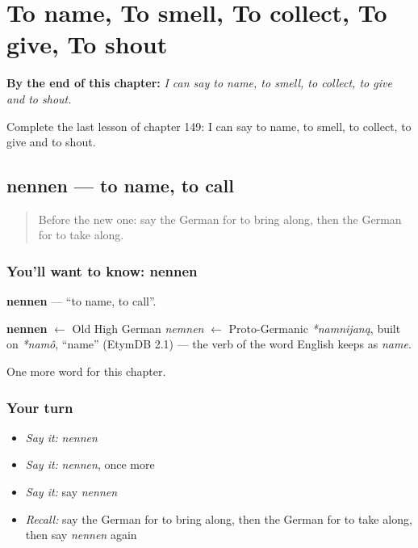 
\chapter{To name, To smell, To collect, To give, To shout}
\label{ch:ge-to-name-to-smell-to-collect-to-give-to-shout}

\begin{chapteropening}
\textbf{By the end of this chapter:} \emph{I can say to name, to smell, to collect, to give and to shout.}

Complete the last lesson of chapter 149: I can say to name, to smell, to collect, to give and to shout.
\end{chapteropening}

\section[nennen]{nennen — to name, to call}

\label{lesson:GE-C149-nennen}



\begin{quote}
Before the new one: say the German for to bring along, then the German for to take along.
\end{quote}

\subsection*{You'll want to know: nennen}
\textbf{nennen} — \textquotedblleft{}to name, to call\textquotedblright{}.

\begin{cousinweb}
\textbf{nennen} $\leftarrow$ Old High German \emph{nemnen} $\leftarrow$ Proto-Germanic \emph{*namnijaną}, built on \emph{*namô}, \textquotedblleft{}name\textquotedblright{} (EtymDB 2.1) — the verb of the word English keeps as \emph{name}.
\end{cousinweb}

\begin{grammarlens}[title={What you've built}]
One more word for this chapter.
\end{grammarlens}

\subsection*{Your turn}
\begin{itemize}
\raggedright
  \item \emph{Say it:} \emph{nennen}
  \item \emph{Say it:} \emph{nennen}, once more
  \item \emph{Say it:} say \emph{nennen}
  \item \emph{Recall:} say the German for to bring along, then the German for to take along, then say \emph{nennen} again
\end{itemize}

